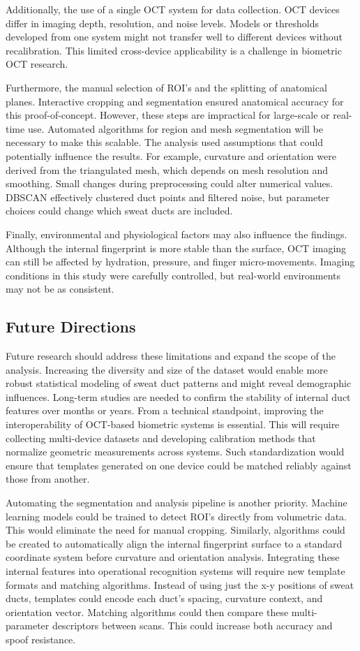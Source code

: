 Additionally, the use of a single OCT system for data collection. OCT devices differ in imaging depth, resolution, and noise levels. Models or thresholds developed from one system might not transfer well to different devices without recalibration. This limited cross-device applicability is a challenge in biometric OCT research. 

Furthermore, the manual selection of ROI’s and the splitting of anatomical planes. Interactive cropping and segmentation ensured anatomical accuracy for this proof-of-concept. However, these steps are impractical for large-scale or real-time use. Automated algorithms for region and mesh segmentation will be necessary to make this scalable. The analysis used assumptions that could potentially influence the results. For example, curvature and orientation were derived from the triangulated mesh, which depends on mesh resolution and smoothing. Small changes during preprocessing could alter numerical values. DBSCAN effectively clustered duct points and filtered noise, but parameter choices could change which sweat ducts are included. 

Finally, environmental and physiological factors may also influence the findings. Although the internal fingerprint is more stable than the surface, OCT imaging can still be affected by hydration, pressure, and finger micro-movements. Imaging conditions in this study were carefully controlled, but real-world environments may not be as consistent.
\subsection{Future Directions}

Future research should address these limitations and expand the scope of the analysis. Increasing the diversity and size of the dataset would enable more robust statistical modeling of sweat duct patterns and might reveal demographic influences. Long-term studies are needed to confirm the stability of internal duct features over months or years. From a technical standpoint, improving the interoperability of OCT-based biometric systems is essential. This will require collecting multi-device datasets and developing calibration methods that normalize geometric measurements across systems. Such standardization would ensure that templates generated on one device could be matched reliably against those from another.

Automating the segmentation and analysis pipeline is another priority. Machine learning models could be trained to detect ROI’s directly from volumetric data. This would eliminate the need for manual cropping. Similarly, algorithms could be created to automatically align the internal fingerprint surface to a standard coordinate system before curvature and orientation analysis. Integrating these internal features into operational recognition systems will require new template formats and matching algorithms. Instead of using just the x-y positions of sweat ducts, templates could encode each duct’s spacing, curvature context, and orientation vector. Matching algorithms could then compare these multi-parameter descriptors between scans. This could increase both accuracy and spoof resistance.

